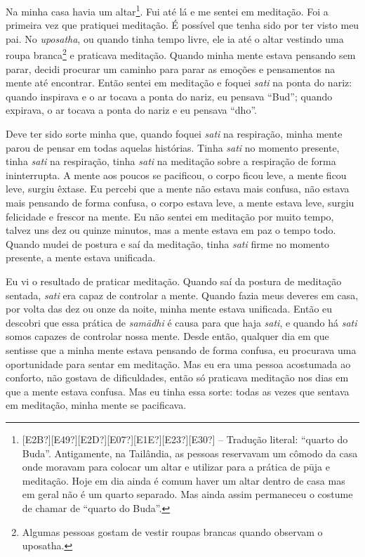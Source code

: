 Na minha casa havia um
altar\footnote{[E2B?][E49?][E2D?][E07?][E1E?][E23?][E30?]  – Tradução
literal: “quarto do Buda”. Antigamente, na Tailândia, as pessoas
reservavam um cômodo da casa onde moravam para colocar um altar e
utilizar para a prática de p\=uja e meditação. Hoje em dia ainda é
comum haver um altar dentro de casa mas em geral não é um quarto
separado. Mas ainda assim permaneceu o costume de chamar de “quarto do
Buda”.}. Fui até lá e me sentei em meditação. Foi a primeira vez que
pratiquei meditação. É possível que tenha sido por ter visto meu pai.
No \textit{uposatha}, ou quando tinha tempo livre, ele ia até o altar
vestindo uma roupa branca\footnote{Algumas pessoas gostam de vestir
roupas brancas quando observam o uposatha.} e praticava meditação.
Quando minha mente estava pensando sem parar, decidi procurar um
caminho para parar as emoções e pensamentos na mente até encontrar.
Então sentei em meditação e foquei \textit{sati }na ponta do nariz:
quando inspirava e o ar tocava a ponta do nariz, eu pensava “Bud”;
quando expirava, o ar tocava a ponta do nariz e eu pensava “dho”.

Deve ter sido sorte minha que, quando foquei \textit{sati }na
respiração, minha mente parou de pensar em todas aquelas histórias.
Tinha \textit{sati }no momento presente, tinha \textit{sati }na
respiração, tinha \textit{sati }na meditação sobre a respiração de
forma ininterrupta. A mente aos poucos se pacificou, o corpo ficou
leve, a mente ficou leve, surgiu êxtase. Eu percebi que a mente não
estava mais confusa, não estava mais pensando de forma confusa, o corpo
estava leve, a mente estava leve, surgiu felicidade e frescor na mente.
Eu não sentei em meditação por muito tempo, talvez uns dez ou quinze
minutos, mas a mente estava em paz o tempo todo. Quando mudei de
postura e saí da meditação, tinha \textit{sati }firme no momento
presente, a mente estava unificada.

Eu vi o resultado de praticar meditação. Quando saí da postura de
meditação sentada, \textit{sati }era capaz de controlar a mente. Quando
fazia meus deveres em casa, por volta das dez ou onze da noite, minha
mente estava unificada. Então eu descobri que essa prática de
\textit{sam\=adhi }é causa para que haja \textit{sati}, e quando há
\textit{sati }somos capazes de controlar nossa mente. Desde então,
qualquer dia em que sentisse que a minha mente estava pensando de forma
confusa, eu procurava uma oportunidade para sentar em meditação. Mas eu
era uma pessoa acostumada ao conforto, não gostava de dificuldades,
então só praticava meditação nos dias em que a mente estava confusa.
Mas eu tinha essa sorte: todas as vezes que sentava em meditação, minha
mente se pacificava.

